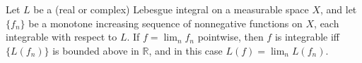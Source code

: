 Let $L$ be a (real or complex) Lebesgue integral on a measurable space $X$, and let $\{f_n\}$ be a monotone increasing sequence of nonnegative functions on $X$, each integrable with respect to $L$. If $f = \lim_n f_n$ pointwise, then $f$ is integrable iff $\{L(f_n)\}$ is bounded above in $\mathbb{R}$, and in this case $L(f) = \lim_n L(f_n)$.
